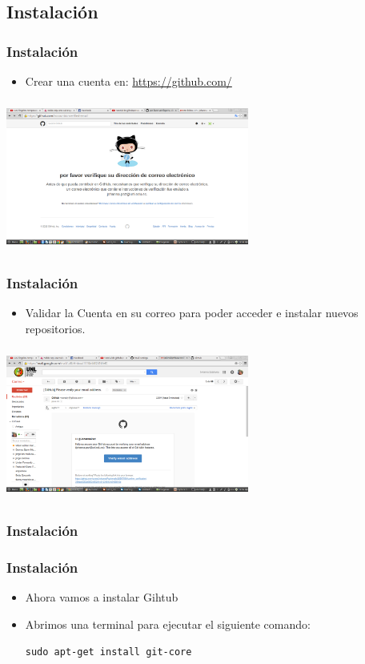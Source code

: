 \documentclass{beamer}
\begin{document}
\subsection{Instalación}
	\begin{frame}
			\frametitle{Instalación}
			{\small
		\begin{itemize}
			\item {\textsf{Crear una cuenta en: }}\url{https://github.com/}
		\end{itemize}
		}
		\begin{center}
			\includegraphics[width=8cm,height=5cm]{manual-img1.png}
		\end{center}
	\end{frame}
	\begin{frame}
		\frametitle{Instalación}
		\begin{itemize}
			\item {\sffamily Validar la Cuenta en su correo para poder acceder e instalar nuevos repositorios.}
		\end{itemize}
		\begin{center}
			\includegraphics[width=8cm,height=5cm]{manual-img2.png}
		\end{center}
	\end{frame}

	\begin{frame}
		\frametitle{Instalación}
	\frametitle{Instalación}
		\begin{itemize}
			\item Ahora vamos a instalar Gihtub
			\item Abrimos una terminal para ejecutar el siguiente comando:
			\begin{center}
				 {\tt sudo apt-get install git-core}
			\end{center}	
		\end{itemize}
	\end{frame}	
\end{document}
